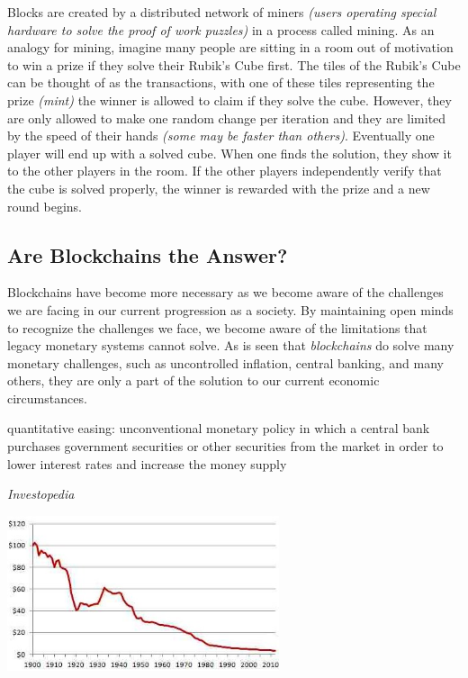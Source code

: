 \documentclass[11pt]{article}
\begin{document}
Blocks are created by a distributed network of miners \textit{(users operating special hardware to solve the proof of work puzzles)} in a process called mining.
As an analogy for mining, imagine many people are sitting in a room out of motivation to win a prize if they solve their Rubik's Cube first.
The tiles of the Rubik's Cube can be thought of as the transactions, with one of these tiles representing the prize \textit{(mint)} the winner is allowed to claim if they solve the cube. 
However, they are only allowed to make one random change per iteration and they are limited by the speed of their hands \textit{(some may be faster than others)}.
Eventually one player will end up with a solved cube.
When one finds the solution, they show it to the other players in the room.
If the other players independently verify that the cube is solved properly, the winner is rewarded with the prize and a new round begins.

\subsection{Are Blockchains the Answer?}

Blockchains have become more necessary as we become aware of the challenges we are facing in our current progression as a society.
By maintaining open minds to recognize the challenges we face, we become aware of the limitations that legacy monetary systems cannot solve. 
As is seen that \textit{blockchains} do solve many monetary challenges, such as uncontrolled inflation, central banking, and many others, they are only a part of the solution to our current economic circumstances.

\epigraph{quantitative easing: unconventional monetary policy in which a central bank purchases government securities or other securities from the market in order to lower interest rates and increase the money supply}{\textit{Investopedia}}

\vspace{-138pt}
\hspace{-25pt}
\includegraphics[width=0.60\textwidth]{./images/us-dollar.jpg}
\vspace{5pt}
\end{document}
